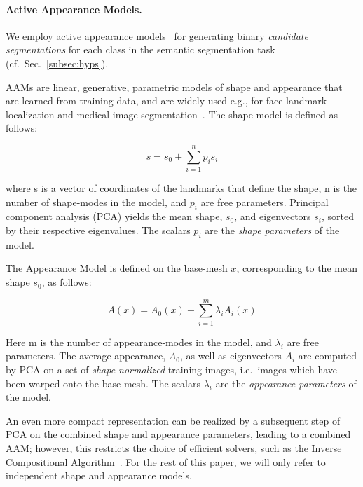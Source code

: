 \documentclass[10pt,twocolumn,letterpaper]{article}
\begin{document}
\paragraph{Active Appearance Models. }
We employ active appearance models~\cite{CootesAAM2001} for generating binary \emph{candidate segmentations} for each class in the semantic segmentation task (cf.\ Sec.\ \ref{subsec:hyps}). 

AAMs are linear, generative, parametric models of shape and appearance that are learned from training data, and are widely used e.g., for face landmark localization and medical image segmentation~\cite{Heimann2009543}. 
%
The shape model is defined as follows:

\[s = s_0 + \sum_{i=1}^n p_i s_i\]

where s is a vector of coordinates of the landmarks that define the shape, n is the number of shape-modes in the model, and $p_i$ are free parameters.  Principal component analysis (PCA) yields the mean shape, $s_0$, and eigenvectors $s_i$, sorted by their respective eigenvalues. The scalars $p_i$ are the \emph{shape parameters} of the model. 

The Appearance Model is defined on the base-mesh  $x$, corresponding to the mean shape $s_0$, as follows:

\[A(x) = A_0(x) + \sum_{i=1}^m \lambda_i A_i(x)\]

Here m is the number of appearance-modes in the model, and $\lambda_i$ are free parameters.  The average appearance, $A_0$, as well as eigenvectors $A_i$ are computed by PCA on a set of \emph{shape normalized} training images, i.e.\ images which have been warped onto the base-mesh. The scalars $\lambda_i$ are the \emph{appearance parameters} of the model. 

An even more compact representation can be realized by a subsequent step of PCA on the combined shape and appearance parameters, leading to a combined AAM; however, this restricts the choice of efficient solvers, such as the Inverse Compositional Algorithm~\cite{BakerAAM2004}. 
For the rest of this paper, we will only refer to independent shape and appearance models.

%
\end{document}
